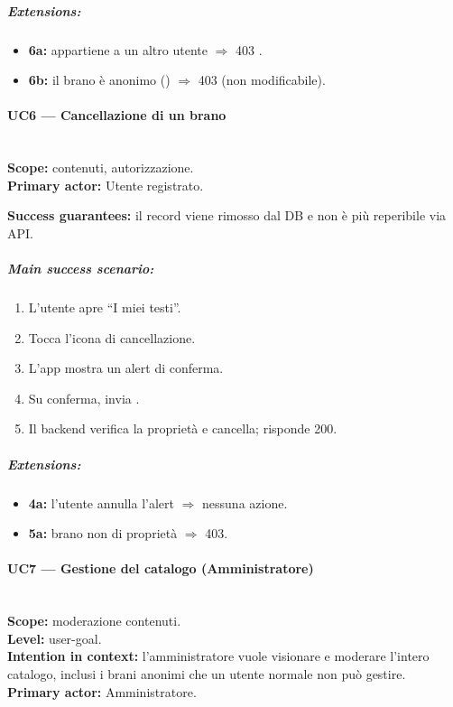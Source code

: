\subparagraph{Extensions:}
\begin{itemize}
    \item \textbf{6a:}  appartiene a un altro utente
    $\Rightarrow$ 403 .
    \item \textbf{6b:} il brano è anonimo ()
    $\Rightarrow$ 403 (non modificabile).
\end{itemize}

\paragraph{UC6 --- Cancellazione di un brano}\hfill\\
\textbf{Scope:} contenuti, autorizzazione.\\
\textbf{Primary actor:} Utente registrato.

\textbf{Success guarantees:} il record  viene rimosso dal DB e
non è più reperibile via API.

\subparagraph{Main success scenario:}
\begin{enumerate}
    \item L'utente apre ``I miei testi''.
    \item Tocca l'icona di cancellazione.
    \item L'app mostra un alert di conferma.
    \item Su conferma, invia .
    \item Il backend verifica la proprietà e cancella; risponde 200.
\end{enumerate}

\subparagraph{Extensions:}
\begin{itemize}
    \item \textbf{4a:} l'utente annulla l'alert $\Rightarrow$ nessuna azione.
    \item \textbf{5a:} brano non di proprietà $\Rightarrow$ 403.
\end{itemize}

\paragraph{UC7 --- Gestione del catalogo (Amministratore)}\hfill\\
\textbf{Scope:} moderazione contenuti.\\
\textbf{Level:} user-goal.\\
\textbf{Intention in context:} l'amministratore vuole visionare e moderare
l'intero catalogo, inclusi i brani anonimi che un utente normale non può
gestire.\\
\textbf{Primary actor:} Amministratore.

